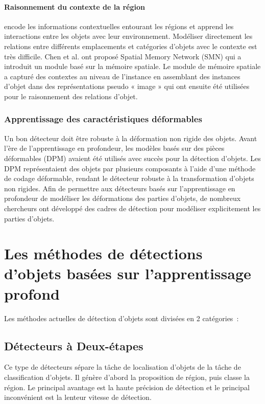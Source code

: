      \paragraph{Raisonnement du contexte de la région} encode les informations contextuelles entourant les régions et apprend les interactions entre les objets avec leur environnement. Modéliser directement les relations entre différents emplacements et catégories d'objets avec le contexte est très difficile. Chen et al. ont proposé Spatial Memory Network (SMN) \cite{smn_paper} qui a introduit un module basé sur la mémoire spatiale. Le module de mémoire spatiale a capturé des contextes au niveau de l'instance en assemblant des instances d'objet dans des représentations pseudo « image » qui ont ensuite été utilisées pour le raisonnement des relations d'objet.
     
     \subsubsection{Apprentissage des caractéristiques déformables}
     Un bon détecteur doit être robuste à la déformation non rigide des objets. Avant l'ère de l'apprentissage en profondeur, les modèles basés sur des pièces déformables (DPM) \cite{dpm_paper} avaient été utilisés avec succès pour la détection d'objets. Les DPM représentaient des objets par plusieurs composants à l'aide d'une méthode de codage déformable, rendant le détecteur robuste à la transformation d'objets non rigides. Afin de permettre aux détecteurs basés sur l'apprentissage en profondeur de modéliser les déformations des parties d'objets, de nombreux chercheurs ont développé des cadres de détection pour modéliser explicitement les parties d'objets.

\section{Les méthodes de détections d'objets basées sur l'apprentissage profond} 
Les méthodes actuelles de détection d'objets sont divisées en 2 catégories :
     \subsection{Détecteurs à Deux-étapes}
     Ce type de détecteurs sépare la tâche de localisation d'objets de la tâche de classification d'objets. Il génère d'abord la proposition de région, puis classe la région. Le principal avantage est la haute précision de détection et le principal inconvénient est la lenteur vitesse de détection.
     
